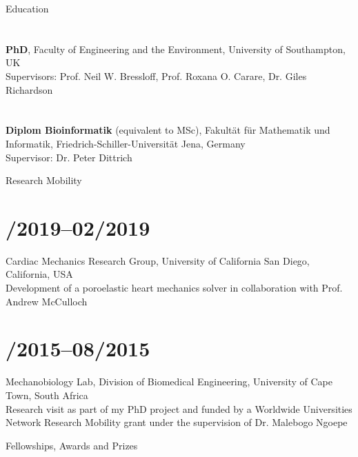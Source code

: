 \documentclass[margin,line,10pt]{res}
\begin{document}
\begin{resume}
\vspace*{-.2in}

{\sc Education}\\
\vspace*{-.35in}
\section{}{\bf PhD}, Faculty of Engineering and the Environment, University of Southampton, UK\\
Supervisors: Prof. Neil W. Bressloff, Prof. Roxana O. Carare, Dr. Giles Richardson\\
\vspace*{-.35in}
\section{}{\bf Diplom Bioinformatik} (equivalent to MSc), Fakultät für Mathematik und Informatik, Friedrich-Schiller-Universität Jena, Germany\\
Supervisor: Dr. Peter Dittrich\\

\vspace*{-.2in}

{\sc Research Mobility}\\
\vspace*{-.35in}
\section{/2019--02/2019}Cardiac Mechanics Research Group, University of California San Diego, California, USA\\
Development of a poroelastic heart mechanics solver in collaboration with Prof. Andrew McCulloch
\vspace*{-.35in}
\section{/2015--08/2015}Mechanobiology Lab, Division of Biomedical Engineering, University of Cape Town, South Africa\\
Research visit as part of my PhD project and funded by a Worldwide Universities Network Research Mobility grant under the supervision of Dr. Malebogo Ngoepe\\

\vspace*{-.2in}

{\sc Fellowships, Awards and Prizes}\\
\vspace*{-.35in}

\end{resume}
\end{document}
